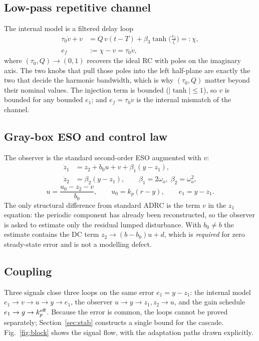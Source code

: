 \documentclass[journal]{IEEEtran}
\theoremstyle{remark}
\newcommand{\ef}{e_f}
\newcommand{\st}{\operatorname{tanh}}
\begin{document}
\subsection{Low-pass repetitive channel}
The internal model is a filtered delay loop
\begin{equation}
\begin{aligned}
\tau_0\dot v+v&=Q\,v(t-T)+\beta_3\st\!\Big(\frac{e_1}{\zeta}\Big)=:\chi,\\
\ef&:=\chi-v=\tau_0\dot v ,
\end{aligned}
\label{eq:rc}
\end{equation}
where $(\tau_0,Q)\to(0,1)$ recovers the ideal RC with poles on the imaginary axis.
The two knobs that pull those poles into the left half-plane are exactly the two
that decide the harmonic bandwidth, which is why $(\tau_0,Q)$ matter beyond their
nominal values. The injection term is bounded ($|\st|\le1$), so $v$ is bounded for
any bounded $e_1$; and $\ef=\tau_0\dot v$ is the internal mismatch of the
channel.

\subsection{Gray-box ESO and control law}
The observer is the standard second-order ESO augmented with $v$:
\begin{equation}
\begin{aligned}
\dot z_1&=z_2+b_0u+v+\beta_1(y-z_1),\\
\dot z_2&=\beta_2(y-z_1),\qquad \beta_1=2\omega_o,\;\beta_2=\omega_o^2 ,
\end{aligned}
\label{eq:eso}
\end{equation}
\begin{equation}
u=\frac{u_0-z_2-v}{b_0},\qquad u_0=k_p(r-y),\qquad e_1=y-z_1 .
\label{eq:law}
\end{equation}
The only structural difference from standard ADRC is the term $v$ in the $z_1$
equation: the periodic component has already been reconstructed, so the observer is
asked to estimate only the residual lumped disturbance. With $b_0\ne b$ the estimate
contains the DC term $z_2\to(b-b_0)u+d$, which is \emph{required} for zero steady-state
error and is not a modelling defect.

\subsection{Coupling}
Three signals close three loops on the same error $e_1=y-z_1$: the internal model
$e_1\to v\to u\to y\to e_1$, the observer $u\to y\to z_1,z_2\to u$, and the gain
schedule $e_1\to g\to k_p^{\rm eff}$. Because the error is common, the loops cannot be
proved separately; Section~\ref{sec:stab} constructs a single bound for the cascade.
Fig.~\ref{fig:block} shows the signal flow, with the adaptation paths drawn explicitly.
\end{document}
